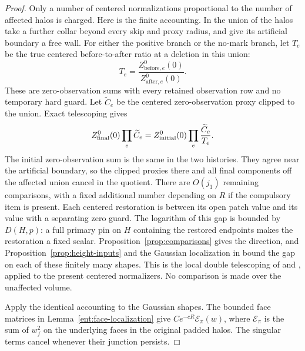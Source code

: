 \begin{proof}
Only a number of centered normalizations proportional to the number
of affected halos is charged.  Here is the finite accounting.  In
the union of the halos take a further collar beyond every skip and
proxy radius, and give its artificial boundary a free wall.  For
either the positive branch or the no-mark branch, let \(T_e\) be
the true centered before-to-after ratio at a deletion in this
union:
\[
 T_e=\frac{Z_{\mathrm{before},e}^0(0)}
           {Z_{\mathrm{after},e}^0(0)}.
\]
These are zero-observation sums with every retained observation
row and no temporary hard guard.  Let \(\widetilde C_e\) be the
centered zero-observation proxy clipped to the union.  Exact
telescoping gives
\[
 Z_{\rm final}^0(0)\prod_e\widetilde C_e
           =Z_{\rm initial}^0(0)\prod_e\frac{\widetilde C_e}{T_e}.
\]
The initial zero-observation sum is the same in the two histories.  They agree
near the artificial boundary, so the clipped proxies there and
all final components off the affected union cancel in the
quotient.  There are \(O(j_1)\) remaining comparisons, with a
fixed additional number depending on \(R\) if the compulsory
item is present.  Each centered restoration is between its open
patch value and its value with a separating zero guard.  The
logarithm of this gap is bounded by \(D(H,p)\): a full primary
pin on \(H\) containing the restored endpoints makes the
restoration a fixed scalar.  Proposition~\ref{prop:comparisons}
gives the direction, and Proposition~\ref{prop:height-inputs}
and the Gaussian localization in \cite[Section~3]{B} bound the
gap on each of these finitely many shapes.  This is the local
double telescoping of \cite[Section~9, Lemma~9.3]{B} and
\cite[Equation~(4.6)]{C}, applied to the present centered
normalizers.  No comparison is made over the unaffected volume.

Apply the identical accounting to the Gaussian shapes.  The
bounded face matrices in Lemma~\ref{ent:face-localization}
give \(Ce^{-cR}\mathcal E_\pi(w)\), where
\(\mathcal E_\pi\) is the sum of \(w_f^2\) on the underlying
faces in the original padded halos.  The singular terms cancel
whenever their junction persists.


\end{proof}

